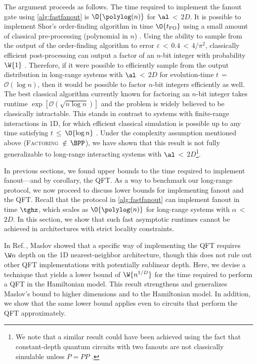 The argument proceeds as follows.
The time required to implement the fanout gate using \cref{alg:fastfanout} is $\O{\polylog(n)}$ for $\al$\,$<$\,$2D$.
It is possible to implement Shor's order-finding algorithm in time $\O{t_\mathrm{FO}}$ using a small amount of classical pre-processing (polynomial in $n$) \cite{Cleve2000,Hoyer2005}.
Using the ability to sample from the output of the order-finding algorithm to error $\varepsilon$\,$<$\,$0.4$\,$<$\,$4/\pi^2$, classically efficient post-processing can output a factor of an $n$-bit integer with probability $\W{1}$ \cite{Shor1997}.
Therefore, if it were possible to efficiently sample from the output distribution in long-range systems with $\al$\,$<$\,$2D$ for evolution-time $t$\,$=$\,$\mathcal{O}(\log n)$, then it would be possible to factor $n$-bit integers efficiently as well.
The best classical algorithm currently known for factoring an $n$-bit integer takes runtime $\exp[\mathcal{O}(\sqrt{n \log n})]$ \cite{Lenstra1992} and the problem is widely believed to be classically intractable.
This stands in contrast to systems with finite-range interactions in 1D, for which efficient classical simulation is possible up to any time satisfying $t$\,$\leq$\,$\O{\log n}$ \cite{Osborne2006}.
Under the complexity assumption mentioned above (\textsc{Factoring} $\notin$\,$\BPP$), we have shown that this result is not fully generalizable to long-range interacting systems with $\al$\,$<$\,$2D$\footnote{We note that a similar result could have been achieved using the fact that constant-depth quantum circuits with two fanouts are not classically simulable unless $P = PP$ \cite{Takahashi2014}.}.



In previous sections, we found upper bounds to the time required to implement fanout---and by corollary, the QFT.
As a way to benchmark our long-range protocol, we now proceed to discuss lower bounds for implementing fanout and the QFT.
Recall that the protocol in \cref{alg:fastfanout} can implement fanout in time $\tghz$, which scales as $\O{\polylog(n)}$ for long-range systems with $\alpha$\,$<$\,$2D$.
In this section, we show that such fast asymptotic runtimes cannot be achieved in architectures with strict locality constraints.

In Ref.\,\cite{Maslov2007}, Maslov showed that a specific way of implementing the QFT requires $\W n$ depth on the 1D  nearest-neighbor architecture, though this does not rule out other QFT implementations with potentially sublinear depth.
Here, we devise a technique that yields a lower bound of $\W {n^{1/D}}$ for the time required to perform a QFT in the Hamiltonian model.
This result strengthens and generalizes Maslov's bound to higher dimensions and to the Hamiltonian model.
In addition, we show that the same lower bound applies even to circuits that perform the QFT approximately.

